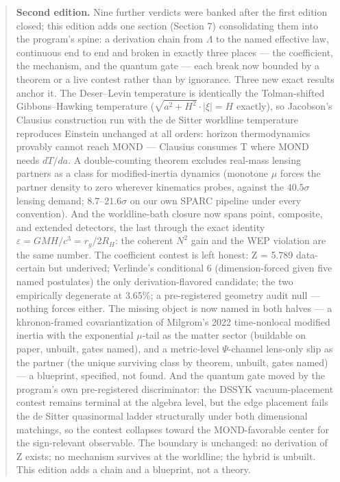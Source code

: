 \documentclass[11pt,a4paper]{article}
\begin{document}
\begin{abstract}
\textbf{Second edition.} Nine further verdicts were banked after the first edition closed; this edition adds one section (Section 7) consolidating them into the program's spine: a derivation chain from $\Lambda$ to the named effective law, continuous end to end and broken in exactly three places --- the coefficient, the mechanism, and the quantum gate --- each break now bounded by a theorem or a live contest rather than by ignorance. Three new exact results anchor it. The Deser--Levin temperature is identically the Tolman-shifted Gibbons--Hawking temperature ($\sqrt{a^2+H^2}\cdot|\xi| = H$ exactly), so Jacobson's Clausius construction run with the de Sitter worldline temperature reproduces Einstein unchanged at all orders: horizon thermodynamics provably cannot reach MOND --- Clausius consumes T where MOND needs $dT/da$. A double-counting theorem excludes real-mass lensing partners as a class for modified-inertia dynamics (monotone $\mu$ forces the partner density to zero wherever kinematics probes, against the $40.5\sigma$ lensing demand; $8.7$--$21.6\sigma$ on our own SPARC pipeline under every convention). And the worldline-bath closure now spans point, composite, and extended detectors, the last through the exact identity $\varepsilon = GMH/c^3 = r_g/2R_H$: the coherent $N^{2}$ gain and the WEP violation are the same number. The coefficient contest is left honest: Z = 5.789 data-certain but underived; Verlinde's conditional 6 (dimension-forced given five named postulates) the only derivation-flavored candidate; the two empirically degenerate at 3.65\%; a pre-registered geometry audit null --- nothing forces either. The missing object is now named in both halves --- a khronon-framed covariantization of Milgrom's 2022 time-nonlocal modified inertia with the exponential $\mu$-tail as the matter sector (buildable on paper, unbuilt, gates named), and a metric-level $\Psi$-channel lens-only slip as the partner (the unique surviving class by theorem, unbuilt, gates named) --- a blueprint, specified, not found. And the quantum gate moved by the program's own pre-registered discriminator: the DSSYK vacuum-placement contest remains terminal at the algebra level, but the edge placement fails the de Sitter quasinormal ladder structurally under both dimensional matchings, so the contest collapses toward the MOND-favorable center for the sign-relevant observable. The boundary is unchanged: no derivation of Z exists; no mechanism survives at the worldline; the hybrid is unbuilt. This edition adds a chain and a blueprint, not a theory.


\end{abstract}
\end{document}
